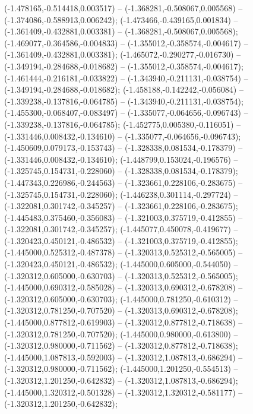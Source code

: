  (-1.478165,-0.514418,0.003517) -- (-1.368281,-0.508067,0.005568) -- (-1.374086,-0.588913,0.006242);
 (-1.473466,-0.439165,0.001834) -- (-1.361409,-0.432881,0.003381) -- (-1.368281,-0.508067,0.005568);
 (-1.469077,-0.364586,-0.004833) -- (-1.355012,-0.358574,-0.004617) -- (-1.361409,-0.432881,0.003381);
 (-1.465072,-0.290277,-0.016730) -- (-1.349194,-0.284688,-0.018682) -- (-1.355012,-0.358574,-0.004617);
 (-1.461444,-0.216181,-0.033822) -- (-1.343940,-0.211131,-0.038754) -- (-1.349194,-0.284688,-0.018682);
 (-1.458188,-0.142242,-0.056084) -- (-1.339238,-0.137816,-0.064785) -- (-1.343940,-0.211131,-0.038754);
 (-1.455300,-0.068407,-0.083497) -- (-1.335077,-0.064656,-0.096743) -- (-1.339238,-0.137816,-0.064785);
 (-1.452775,0.005380,-0.116051) -- (-1.331446,0.008432,-0.134610) -- (-1.335077,-0.064656,-0.096743);
 (-1.450609,0.079173,-0.153743) -- (-1.328338,0.081534,-0.178379) -- (-1.331446,0.008432,-0.134610);
 (-1.448799,0.153024,-0.196576) -- (-1.325745,0.154731,-0.228060) -- (-1.328338,0.081534,-0.178379);
 (-1.447343,0.226986,-0.244563) -- (-1.323661,0.228106,-0.283675) -- (-1.325745,0.154731,-0.228060);
 (-1.446238,0.301114,-0.297724) -- (-1.322081,0.301742,-0.345257) -- (-1.323661,0.228106,-0.283675);
 (-1.445483,0.375460,-0.356083) -- (-1.321003,0.375719,-0.412855) -- (-1.322081,0.301742,-0.345257);
 (-1.445077,0.450078,-0.419677) -- (-1.320423,0.450121,-0.486532) -- (-1.321003,0.375719,-0.412855);
 (-1.445000,0.525312,-0.487378) -- (-1.320313,0.525312,-0.565005) -- (-1.320423,0.450121,-0.486532);
 (-1.445000,0.605000,-0.544050) -- (-1.320312,0.605000,-0.630703) -- (-1.320313,0.525312,-0.565005);
 (-1.445000,0.690312,-0.585028) -- (-1.320313,0.690312,-0.678208) -- (-1.320312,0.605000,-0.630703);
 (-1.445000,0.781250,-0.610312) -- (-1.320312,0.781250,-0.707520) -- (-1.320313,0.690312,-0.678208);
 (-1.445000,0.877812,-0.619903) -- (-1.320312,0.877812,-0.718638) -- (-1.320312,0.781250,-0.707520);
 (-1.445000,0.980000,-0.613800) -- (-1.320312,0.980000,-0.711562) -- (-1.320312,0.877812,-0.718638);
 (-1.445000,1.087813,-0.592003) -- (-1.320312,1.087813,-0.686294) -- (-1.320312,0.980000,-0.711562);
 (-1.445000,1.201250,-0.554513) -- (-1.320312,1.201250,-0.642832) -- (-1.320312,1.087813,-0.686294);
 (-1.445000,1.320312,-0.501328) -- (-1.320312,1.320312,-0.581177) -- (-1.320312,1.201250,-0.642832);
